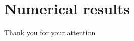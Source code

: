 \documentclass{beamer}
\begin{document}
\section{Numerical results}

\begin{frame}{}
  
\end{frame}


\begin{frame}[t]
  \vfill
  { Thank you for your attention}
  \vfill
\end{frame}
\end{document}
